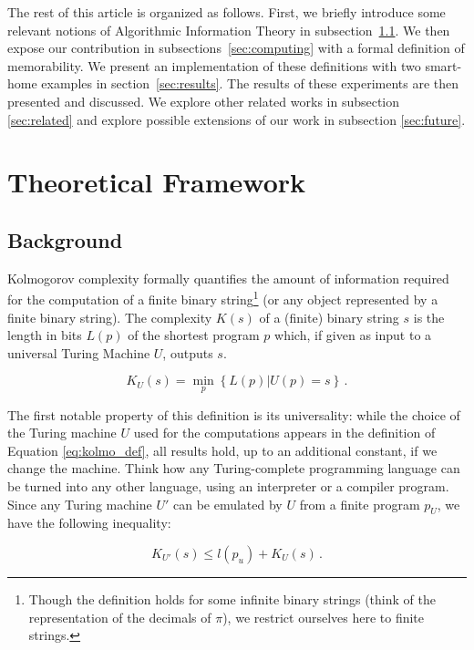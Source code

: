 \documentclass[entropy,article,submit,moreauthors,pdftex]{Definitions/mdpi}
\begin{document}
The rest of this article is organized as follows.
First, we briefly introduce
some relevant notions of Algorithmic Information Theory in subsection~\ref{sec:theory}. We then expose our contribution in subsections~\ref{sec:computing} with a formal definition of memorability. We present an implementation of these definitions with two smart-home examples in section~\ref{sec:results}. The results of these experiments are then presented and discussed. We explore other related works in subsection \ref{sec:related} and explore possible extensions of our work in subsection \ref{sec:future}.

\section{Theoretical Framework}
\label{sec:framework}

\subsection{Background}
\label{sec:theory}
Kolmogorov complexity formally quantifies the amount of information required
for the computation of a finite binary string\footnote{Though the definition
    holds for some infinite binary strings (think of the representation of the
    decimals of $\pi$), we restrict ourselves here to finite strings.} (or
any object represented by a finite binary
string)\cite{kolmogorov_three_1965,li_introduction_2008}. The complexity $K(s)$ of a (finite) binary string $s$ is the length in bits $L(p)$ of the shortest program $p$
which, if given as input to a universal Turing Machine $U$, outputs $s$.

\begin{equation}
    \label{eq:kolmo_def}
    K_{U}(s) = \min_{p}\left\{L(p)|U(p)=s\right\}\,.
\end{equation}

The first notable property of this definition is its universality: while the
choice of the Turing machine $U$ used for the computations appears in the
definition of Equation \ref{eq:kolmo_def}, all results hold, up to an additional
constant, if we change the machine. Think how any Turing-complete programming language can
be turned into any other language, using an interpreter or a compiler program. Since any
Turing machine $U'$ can be emulated by $U$ from a
finite program $p_{U}$, we have the following inequality:

\begin{equation}
    \label{eq:inequality_univ}
    K_{U'}(s) \le l(p_{u}) + K_{U}(s)\,.
\end{equation}
\end{document}
